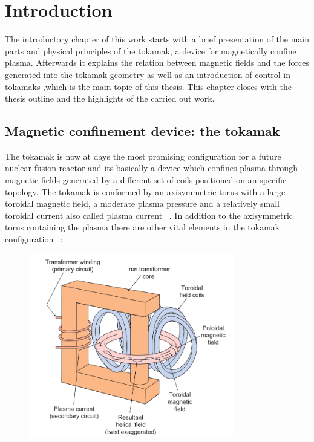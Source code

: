 \chapter{Introduction}

The introductory chapter of this work starts with a brief presentation of the main parts  and physical principles of the tokamak, a device for magnetically confine plasma. Afterwards it  explains the relation between magnetic fields and the forces generated into the tokamak geometry  as well as an introduction of control in tokamaks ,which is the main topic of this thesis. This chapter closes with the thesis outline and the highlights of the carried out work. 

\section{Magnetic confinement device: the tokamak}

The tokamak is now at days the most promising configuration for a future nuclear fusion reactor and its basically a device which confines plasma through magnetic fields generated by a different set of coils positioned on an specific topology.  The tokamak is conformed by an axisymmetric torus with a large toroidal magnetic field, a moderate plasma pressure and a relatively small toroidal current also called plasma current ~\cite[Chapter~13]{Freidberg2007}. In addition to the axisymmetric torus containing the plasma there are other vital elements in the tokamak configuration ~\cite[Chapter~1]{Song2014}: \smallskip

\begin{figure}[h]
	\centering
	\includegraphics[width=0.8\textwidth]{Chp1/Tokamak_parts.png}
	\caption{ ~\cite{McCracken2005} \label{Tkmk_parts}}
\end{figure}

